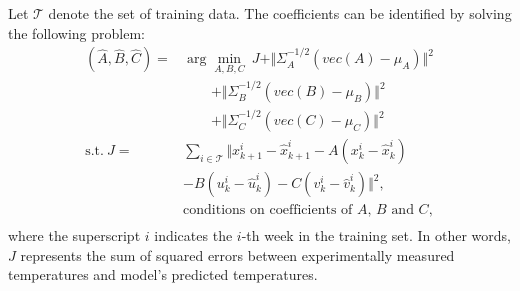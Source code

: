 Let $\mathcal{T}$ denote the set of training data.
The coefficients can be identified by solving the following problem:
\begin{equation}\label{eq:data_opt}
\begin{aligned}
(\hat{A}, \hat{B} , \hat{C}) = &\arg\min_{A, B, C}~J + \Vert \Sigma_A^{-1/2} (vec(A) - \mu_A) \Vert^2\\
& \quad\quad + \Vert \Sigma_B^{-1/2} (vec(B) - \mu_B)  \Vert^2 \\
& \quad\quad + \Vert \Sigma_C^{-1/2} (vec(C) - \mu_C)  \Vert^2 \\
\text{s.t.}~ J = & \textstyle \sum_{i \in \mathcal{T}} \Vert x_{k+1}^i - \hat{x}_{k+1}^i - A\left( x_k^i - \hat{x}_k^i \right) \\
& - B\left( u_k^i - \hat{u}_k^i \right) - C\left( v_k^i - \hat{v}_k^i \right) \Vert ^ 2,\\
& \text{conditions on coefficients of $A$, $B$ and $C$}, \\
\end{aligned}
\end{equation}
where the superscript $i$ indicates the $i$-th week in the training set.
In other words, $J$ represents the sum of squared errors between experimentally measured temperatures and model's predicted temperatures.



